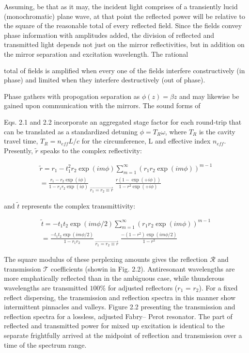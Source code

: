 Assuming, be that as it may, the incident light comprises of a transiently lucid (monochromatic) plane wave, at that point the reflected power will be relative to the square of the reasonable total of every reflected field. Since the fields convey phase information with amplitudes added, the division of reflected and transmitted light depends not just on the mirror reflectivities, but in addition on the mirror separation and excitation wavelength. The rational 

total of fields is amplified when every one of the fields interfere constructively (in phase) and limited when they interfere destructively (out of phase). 

Phase gathers with propogation separation as $\phi(z) = \beta z$ and may likewise be gained upon communication with the mirrors. The sound forms of 

Eqs. 2.1 and 2.2 incorporate an aggregated stage factor for each round-trip that can be translated as a standardized detuning $\phi = T_{R}\omega$, where $T_{R}$ is the cavity travel time, $T_{R} = n_{eff}L/c$ for the circumference, L and effective index $n_{eff}$. Presently, $\tilde{r}$ speaks to the complex reflectivity:

\begin{multline}
\tilde{r} = r_{1} - t_{1}^{2}r_{2}\exp{(i m \phi)} \sum_{m=1}^{\infty} (r_{1}r_{2}\exp{(i m \phi)})^{m-1} \\ = \frac{r_{1} - r_{2}\exp{(i \phi)}}{1 - r_{1}r_{2}\exp{(i \phi)}} _{\; \overrightarrow{r_{1} = r_{2} \equiv r}} \; \frac{r(1-\exp{(+i \phi)})}{1-r^{2}\exp{(+i \phi)}}
\end{multline}

and $\tilde{t}$ represents the complex transmittivity:

\begin{multline}
\tilde{t} = -t_{1}t_{2}\exp{(i m \phi/2)} \sum_{m=1}^{\infty} (r_{1}r_{2}\exp{(i m \phi)})^{m-1} \\ = \frac{-t_{1}t_{2}\exp{(i m \phi/2)}}{1 - r_{1}r_{2}} _{\; \overrightarrow{r_{1} = r_{2} \equiv r}} \; \frac{-(1-r^{2})\exp{(im \phi/2)}}{1-r^{2}}
\end{multline}


The square modulus of these perplexing amounts gives the reflection ${\mathcal R}$ and transmission ${\mathcal T}$ coefficients (showin in Fig. 2.2). Antiresonant wavelengths are more emphatically reflected than in the ambiguous case, while thunderous wavelengths are transmitted $100\%$ for adjusted reflectors ($r_{1}$ = $r_{2}$). For a fixed reflect dispersing, the transmission and reflection spectra in this manner show intermittent pinnacles and valleys. Figure 2.2 presenting the transmission and reflection spectra for a lossless, adjusted Fabry– Perot resonator. The part of reflected and transmitted power for mixed up excitation is identical to the separate frightfully arrived at the midpoint of reflection and transmission over a time of the spectrum range.

